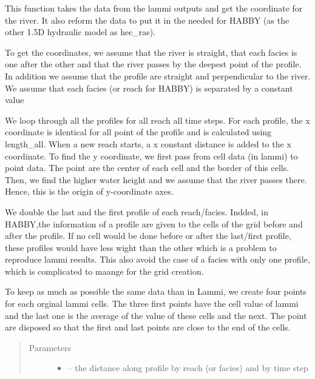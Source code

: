 \documentclass[letterpaper,10pt,english]{sphinxmanual}
\begin{document}
\begin{fulllineitems}
\label{\detokenize{index:src.lammi.coord_lammi}}
This function takes the data from the lammi outputs and get the coordinate for the river. It also
reform the data to put it in the needed for HABBY (as the other 1.5D hydraulic model as hec\_ras).

To get the coordinates, we assume that the river is straight, that each facies is one after the other and
that the river passes by the deepest point of the profile. In addition we assume that the profile are straight
and perpendicular to the river. We assume that each facies (or reach for HABBY) is separated by a constant value

We loop through all the profiles for all reach all time steps. For each profile, the x coordinate is identical
for all point of the profile and is calculated using length\_all. When a new reach starts, a x constant distance
is added to the x coordinate. To find the y coordinate, we first pass from cell data (in lammi) to point data.
The point are the center of each cell and the border of this cells.  Then, we find the higher water height and
we assume that the river passes there. Hence, this is the origin of y-coordinate axes.

We double the last and the first profile of each reach/facies. Indded, in HABBY,the information of a profile are
given to the cells of the grid before and after the profile. If no cell would be done before or after the last/first
profile, these profiles would have less wight than the other which is a problem to reproduce lammi results. This
also avoid the case of a facies with only one profile, which is complicated to maange for the grid creation.

To keep as much as possible the same data than in Lammi, we create four points for each orginal lammi cells. The
three first points have the cell value of lammi and the last one is the average of the value of these cells and
the next. The point are disposed so that the first and last points are close to the end of the cells.
\begin{quote}\begin{description}
\item[{Parameters}] \leavevmode\begin{itemize}
\item {} 
 -- the distance along profile by reach (or facies) and by time step


\end{itemize}
\end{description}
\end{quote}
\end{fulllineitems}
\end{document}

